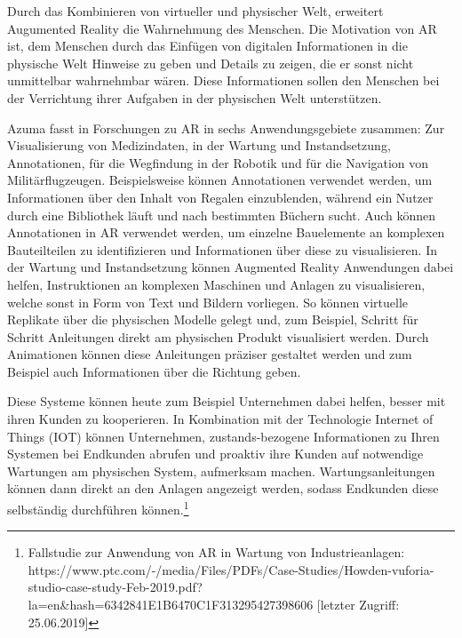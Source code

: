 \cite{Azuma1997} Durch das Kombinieren von virtueller und physischer Welt, erweitert Augumented Reality die Wahrnehmung des Menschen. Die Motivation von AR ist, dem Menschen durch das Einfügen
von digitalen Informationen in die physische Welt Hinweise zu geben und Details zu zeigen, die er sonst nicht unmittelbar wahrnehmbar wären. Diese Informationen sollen den Menschen 
bei der Verrichtung ihrer Aufgaben in der physischen Welt unterstützen.

Azuma fasst in \cite{Azuma1997} Forschungen zu AR in sechs Anwendungsgebiete zusammen: Zur Visualisierung von Medizindaten, in der Wartung 
und Instandsetzung, Annotationen, für die Wegfindung in der Robotik und für die Navigation von Militärflugzeugen. Beispielsweise können Annotationen 
verwendet werden, um Informationen über den Inhalt von Regalen einzublenden, während ein Nutzer durch eine Bibliothek läuft und nach bestimmten Büchern sucht. %
Auch können Annotationen in AR verwendet werden, um einzelne Bauelemente an komplexen Bauteilteilen zu identifizieren und Informationen über diese zu visualisieren. 
In der Wartung und Instandsetzung können Augmented Reality Anwendungen dabei helfen, Instruktionen an komplexen Maschinen und Anlagen zu visualisieren, welche sonst in 
Form von Text und Bildern vorliegen. So können virtuelle Replikate über die physischen Modelle gelegt und, zum Beispiel, Schritt für Schritt Anleitungen direkt am physischen Produkt visualisiert werden. 
Durch Animationen können diese Anleitungen präziser gestaltet werden und zum Beispiel auch Informationen über die Richtung geben. 

Diese Systeme können heute zum Beispiel Unternehmen dabei helfen, besser mit ihren Kunden zu kooperieren. In Kombination mit der Technologie Internet of Things (IOT) können Unternehmen,
zustands-bezogene Informationen zu Ihren Systemen bei Endkunden abrufen und proaktiv ihre Kunden auf notwendige Wartungen am physischen System, aufmerksam machen. Wartungsanleitungen können dann direkt 
an den Anlagen angezeigt werden, sodass Endkunden diese selbständig durchführen können.\footnote{Fallstudie zur Anwendung von AR in Wartung von Industrieanlagen: https://www.ptc.com/-/media/Files/PDFs/Case-Studies/Howden-vuforia-studio-case-study-Feb-2019.pdf?la=en\&hash=6342841E1B6470C1F313295427398606 [letzter Zugriff: 25.06.2019]}


